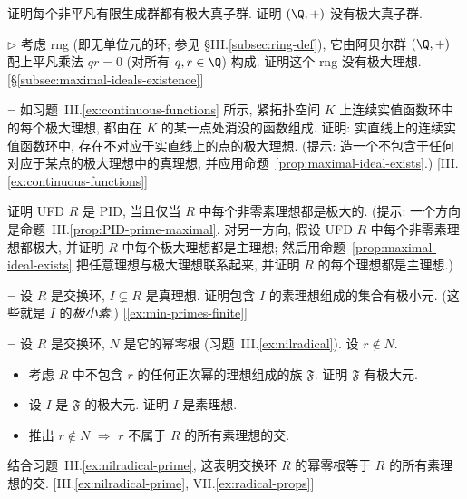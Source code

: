 \begin{prob}
\label{ex:finitely-gen-max-subgroup}
证明每个非平凡有限生成群都有极大真子群. 证明 $(\Q,+)$ 没有极大真子群.
\end{prob}

\begin{prob}
\label{ex:rng-no-maximal}
$\triangleright$ 考虑 rng (即无单位元的环; 参见 §III.\ref{subsec:ring-def}), 它由阿贝尔群 $(\Q,+)$ 配上平凡乘法 $qr=0$ (对所有 $q,r\in\Q$) 构成. 证明这个 rng 没有极大理想. [§\ref{subsec:maximal-ideals-existence}]
\end{prob}

\begin{prob}
\label{ex:maximal-ideals-continuous}
$\neg$ 如习题~III.\ref{ex:continuous-functions} 所示, 紧拓扑空间 $K$ 上连续实值函数环中的每个极大理想, 都由在 $K$ 的某一点处消没的函数组成. 证明: 实直线上的连续实值函数环中, 存在不对应于实直线上的点的极大理想. (提示: 造一个不包含于任何对应于某点的极大理想中的真理想, 并应用命题~\ref{prop:maximal-ideal-exists}.) [III.\ref{ex:continuous-functions}]
\end{prob}

\begin{prob}
\label{ex:ufd-pid-prime-maximal}
证明 UFD $R$ 是 PID, 当且仅当 $R$ 中每个非零素理想都是极大的. (提示: 一个方向是命题~III.\ref{prop:PID-prime-maximal}. 对另一方向, 假设 UFD $R$ 中每个非零素理想都极大, 并证明 $R$ 中每个极大理想都是主理想; 然后用命题~\ref{prop:maximal-ideal-exists} 把任意理想与极大理想联系起来, 并证明 $R$ 的每个理想都是主理想.)
\end{prob}

\begin{prob}
\label{ex:minimal-primes}
$\neg$ 设 $R$ 是交换环, $I\subsetneq R$ 是真理想. 证明包含 $I$ 的素理想组成的集合有极小元. (这些就是 $I$ 的\emph{极小素}.) [\ref{ex:min-primes-finite}]
\end{prob}

\begin{prob}
\label{ex:nilradical-prime-intersection}
$\neg$ 设 $R$ 是交换环, $N$ 是它的幂零根 (习题~III.\ref{ex:nilradical}). 设 $r\notin N$.
\begin{itemize}
\item 考虑 $R$ 中不包含 $r$ 的任何正次幂的理想组成的族 $\mathfrak{F}$. 证明 $\mathfrak{F}$ 有极大元.
\item 设 $I$ 是 $\mathfrak{F}$ 的极大元. 证明 $I$ 是素理想.
\item 推出 $r\notin N$ $\Longrightarrow$ $r$ 不属于 $R$ 的所有素理想的交.
\end{itemize}
结合习题~III.\ref{ex:nilradical-prime}, 这表明交换环 $R$ 的幂零根等于 $R$ 的所有素理想的交. [III.\ref{ex:nilradical-prime}, VII.\ref{ex:radical-props}]
\end{prob}

